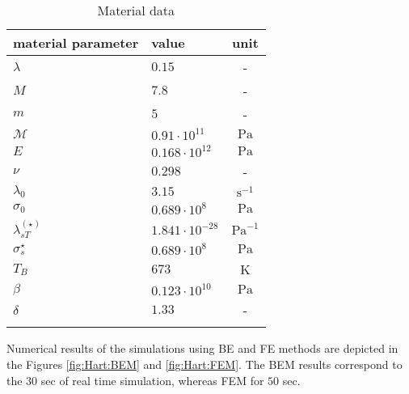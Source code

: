 \begin{longtable}{llc}
\hline  
material parameter & value & unit\\ 
\hline  
$\lambda$& $0.15$& -\\ 
$M$& $7.8$& -\\ 
$m$& $5$& -\\ 
$\mathcal{M}$& $0.91\cdot10^{11}$& $\text{Pa}$\\ 
$E$& $0.168\cdot10^{12}$& $\text{Pa}$\\ 
$\nu$& $0.298$& -\\ 
$\lambda_{0}$& $3.15$& $\text{s}^{-1}$\\ 
$\sigma_{0}$& $0.689\cdot10^{8}$& $\text{Pa}$\\ 
$\lambda_{sT}^{(\star)}$& $1.841\cdot10^{-28}$& $\text{Pa}^{-1}$\\ 
$\sigma^{\star}_{s}$& $0.689\cdot10^{8}$& $\text{Pa}$\\ 
$T_{B}$& $673$& K\\ 
$\beta$& $0.123\cdot10^{10}$& $\text{Pa}$\\ 
$\delta$& $1.33$& -\\ 
\hline  
\caption{Material data}
\end{longtable} 
\begin{comment}
Where $\text{psi}$ - stands for  \textit{\textbf{p}ound-force per \textbf{s}quare \textbf{i}nch}  is a non-SI unit of pressure based on avoirdupois units. $1\text{ psi}=6,894.76\text{ Pa}$. $1\text{ ksi}=10^{3}\text{ psi}$.
\end{comment}
Numerical results of the simulations using  BE and FE methods are depicted in the Figures \ref{fig:Hart:BEM} and \ref{fig:Hart:FEM}. The BEM results correspond to the $30$ sec of real time simulation, whereas FEM for $50$ sec.

